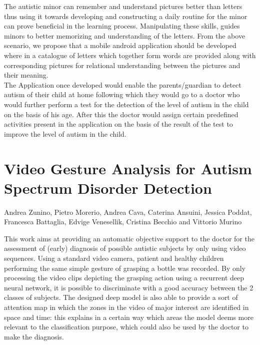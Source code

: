 The autistic minor can remember and understand pictures better than letters thus using it towards developing and constructing a daily routine for the minor can prove beneficial in the learning process. Manipulating these skills, guides minors to better memorizing and understanding of the letters. From the above scenario, we propose that a mobile android application should be developed where in a catalogue of letters which together form words are provided along with corresponding pictures for relational understanding between the pictures and their meaning.\\
The Application once developed would enable the parents/guardian to detect autism of their child at home following which they would go to a doctor who would further perform a test for the detection of the level of autism in the child on the basis of his age. After this the doctor would assign certain predefined activities present in the application on the basis of the result of the test to improve the level of autism in the child.

\section{Video Gesture Analysis for Autism Spectrum Disorder Detection
}

Andrea Zunino, Pietro Morerio, Andrea Cava, Caterina Ansuini, Jessica Poddat, Francesca Battaglia, Edvige Venesellik, Cristina Becchio and Vittorio Murino

 This work aims at providing an automatic objective support to the doctor for the assessment of (early) diagnosis of possible autistic subjects by only using video sequences. Using a standard video camera, patient and healthy children performing the same simple gesture of grasping a bottle was recorded. By only processing the video clips depicting the grasping action using a recurrent deep neural network, it is possible to discriminate with a good accuracy between the 2 classes of subjects. The designed deep model is also able to provide a sort of attention map in which the zones in the video of major interest are identiﬁed in space and time: this explains in a certain way which areas the model deems more relevant to the classiﬁcation purpose, which could also be used by the doctor to make the diagnosis.\\

